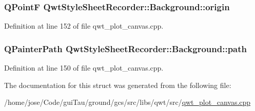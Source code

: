 \hypertarget{struct_qwt_style_sheet_recorder_1_1_background_ae891862aa9d5a59c6b06bb3379a96839}{
\subsubsection[{origin}]{\setlength{\rightskip}{0pt plus 5cm}Q\-Point\-F Qwt\-Style\-Sheet\-Recorder\-::\-Background\-::origin}}\label{struct_qwt_style_sheet_recorder_1_1_background_ae891862aa9d5a59c6b06bb3379a96839}


Definition at line 152 of file qwt\-\_\-plot\-\_\-canvas.\-cpp.

\hypertarget{struct_qwt_style_sheet_recorder_1_1_background_a75b9dfbb2f4b69c141a25cd75ea49526}{
\subsubsection[{path}]{\setlength{\rightskip}{0pt plus 5cm}Q\-Painter\-Path Qwt\-Style\-Sheet\-Recorder\-::\-Background\-::path}}\label{struct_qwt_style_sheet_recorder_1_1_background_a75b9dfbb2f4b69c141a25cd75ea49526}


Definition at line 150 of file qwt\-\_\-plot\-\_\-canvas.\-cpp.



The documentation for this struct was generated from the following file\-:\begin{DoxyCompactItemize}
\item 
/home/jose/\-Code/gui\-Tau/ground/gcs/src/libs/qwt/src/\hyperlink{qwt__plot__canvas_8cpp}{qwt\-\_\-plot\-\_\-canvas.\-cpp}\end{DoxyCompactItemize}
